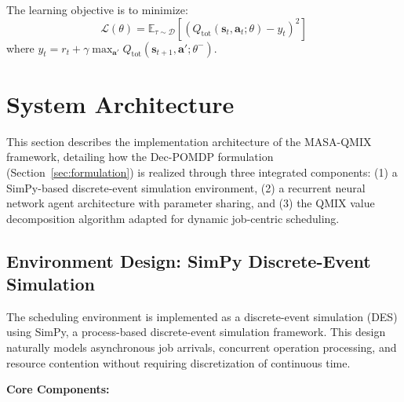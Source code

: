 The learning objective is to minimize:
\[
\mathcal{L}(\theta) = \mathbb{E}_{\tau \sim \mathcal{D}} \left[ \left( Q_{\text{tot}}(\mathbf{s}_t, \mathbf{a}_t; \theta) - y_t \right)^2 \right]
\]
where \( y_t = r_t + \gamma \max_{\mathbf{a}'} Q_{\text{tot}}(\mathbf{s}_{t+1}, \mathbf{a}'; \theta^-) \).


\section{System Architecture}
\label{sec:systemarchitecture}
This section describes the implementation architecture of the MASA-QMIX framework, detailing how the Dec-POMDP formulation (Section~\ref{sec:formulation}) is realized through three integrated components: (1) a SimPy-based discrete-event simulation environment, (2) a recurrent neural network agent architecture with parameter sharing, and (3) the QMIX value decomposition algorithm adapted for dynamic job-centric scheduling.

\subsection{Environment Design: SimPy Discrete-Event Simulation}
\label{sec:env_design}

The scheduling environment is implemented as a discrete-event simulation (DES) using SimPy, a process-based discrete-event simulation framework. This design naturally models asynchronous job arrivals, concurrent operation processing, and resource contention without requiring discretization of continuous time.

\textbf{Core Components:}

